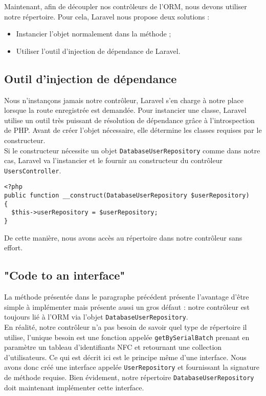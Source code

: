Maintenant, afin de découpler nos contrôleurs de l'ORM, nous devons utiliser notre répertoire. Pour cela, Laravel nous propose deux solutions :
\begin{itemize}
  \item Instancier l'objet normalement dans la méthode ;
  \item Utiliser l'outil d'injection de dépendance de Laravel.
\end{itemize}

\subsection{Outil d'injection de dépendance}

Nous n'instançons jamais notre contrôleur, Laravel s'en charge à notre place lorsque la route enregistrée est demandée. Pour instancier une classe, Laravel utilise un outil très puissant de résolution de dépendance grâce à l'introspection de PHP. Avant de créer l'objet nécessaire, elle détermine les classes requises par le constructeur.\\

Si le constructeur nécessite un objet \verb|DatabaseUserRepository| comme dans notre cas, Laravel va l'instancier et le fournir au constructeur du contrôleur \verb|UsersController|.
\begin{verbatim}
<?php
public function __construct(DatabaseUserRepository $userRepository)
{
  $this->userRepository = $userRepository;
}
\end{verbatim}

De cette manière, nous avons accès au répertoire dans notre contrôleur sans effort.

\subsection{"Code to an interface"}

La méthode présentée dans le paragraphe précédent présente l'avantage d'être simple à implémenter mais présente aussi un gros défaut : notre contrôleur est toujours lié à l'ORM via l'objet \verb|DatabaseUserRepository|.\\

En réalité, notre contrôleur n'a pas besoin de savoir quel type de répertoire il utilise, l'unique besoin est une fonction appelée \verb|getBySerialBatch| prenant en paramètre un tableau d'identifiants NFC et retournant une collection d'utilisateurs. Ce qui est décrit ici est le principe même d'une interface. Nous avons donc créé une interface appelée \verb|UserRepository| et fournissant la signature de méthode requise. Bien évidement, notre répertoire \verb|DatabaseUserRepository| doit maintenant implémenter cette interface.\\


